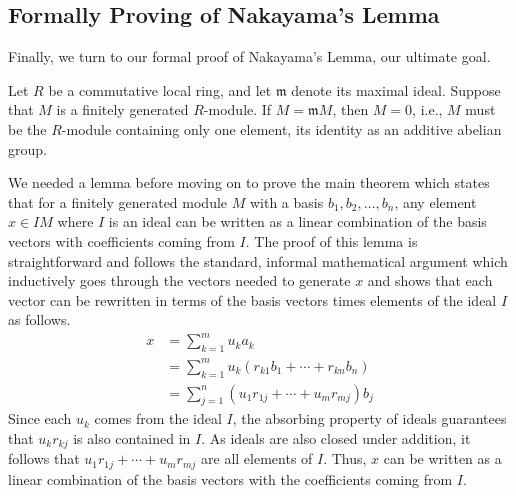 \documentclass{article}
\begin{document}
\subsection{Formally Proving of Nakayama's Lemma}

Finally, we turn to our formal proof of Nakayama's Lemma, our ultimate goal.

\begin{nak*}
Let $R$ be a commutative local ring, and let $\mathfrak{m}$ denote its maximal ideal. 
Suppose that $M$ is a finitely generated $R$-module. 
If $M = \mathfrak{m} M$, then $M = 0$, i.e., $M$ must be the $R$-module containing only one element, its identity as an additive abelian group. 
\end{nak*}

We needed a lemma before moving on to prove the main theorem which states that
for a finitely generated module \(M\) with a basis
\(b_{1}, b_{2}, \dots, b_{n}\), any element \(x\in I M\) where \(I\) is an
ideal can be written as a linear combination of the basis vectors with
coefficients coming from \(I\). The proof of this lemma is straightforward and
follows the standard, informal mathematical argument which inductively goes
through the vectors needed to generate \(x\) and shows that each vector can be
rewritten in terms of the basis vectors times elements of the ideal \(I\) as
follows.
\begin{align*}
  x & = \sum_{k=1}^{m} u_{k} a_{k} \\
    & = \sum_{k=1}^{m} u_{k} (r_{k1} b_{1} + \cdots + r_{kn} b_{n}) \\
    & = \sum_{j=1}^{n} (u_{1} r_{1j} + \cdots + u_{m} r_{mj}) b_{j}
\end{align*}
Since each \(u_{k}\) comes from the ideal \(I\), the absorbing property of
ideals guarantees that \(u_{k} r_{k j}\) is also contained in \(I\). As ideals
are also closed under addition, it follows that \(u_{1} r_{1j} + \cdots +
u_{m} r_{m j}\) are all elements of \(I\). Thus, \(x\) can be written as a
linear combination of the basis vectors with the coefficients coming from
\(I\).
\end{document}
